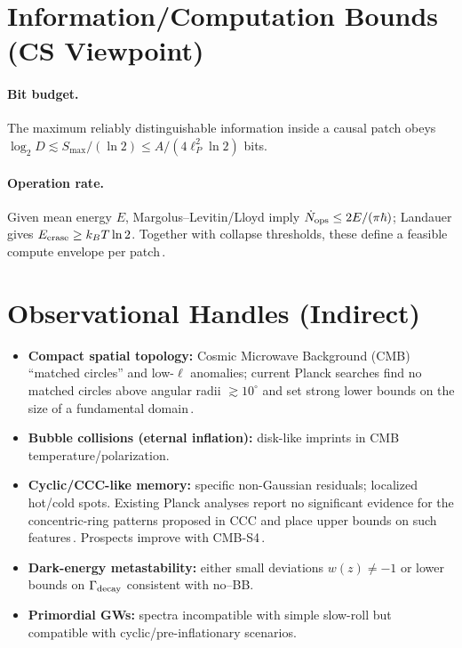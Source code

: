 \documentclass[12pt]{article}
\newcommand{\Smax}{S_{\max}}
\theoremstyle{remark}
\begin{document}
\section{Information/Computation Bounds (CS Viewpoint)}
\paragraph{Bit budget.} The maximum reliably distinguishable information inside a causal patch obeys $\log_2 D \lesssim \Smax/(\ln 2) \le A/(4\ell_P^2\ln 2)$ bits.
\paragraph{Operation rate.} Given mean energy $E$, Margolus--Levitin/Lloyd imply $\dot N_{\rm ops} \le 2E/(\pi\hbar)$; Landauer gives $E_{\rm erase}\ge k_B T \ln 2$. Together with collapse thresholds, these define a feasible compute envelope per patch\,\cite{MargolusLevitin1998,Lloyd2000}.

\section{Observational Handles (Indirect)}
\begin{itemize}[leftmargin=1.2em]
  \item \textbf{Compact spatial topology:} Cosmic Microwave Background (CMB) ``matched circles'' and low-$\ell$ anomalies; current Planck searches find no matched circles above angular radii $\gtrsim 10^{\circ}$ and set strong lower bounds on the size of a fundamental domain\,\cite{CornishSpergelStarkman1998,Planck2016Topology}.
  \item \textbf{Bubble collisions (eternal inflation):} disk-like imprints in CMB temperature/polarization.
  \item \textbf{Cyclic/CCC-like memory:} specific non-Gaussian residuals; localized hot/cold spots. Existing Planck analyses report no significant evidence for the concentric-ring patterns proposed in CCC and place upper bounds on such features\,\cite{WehusEriksen2011,Planck2015Isotropy}. Prospects improve with CMB-S4\,\cite{CMBS4SB}.
  \item \textbf{Dark-energy metastability:} either small deviations $w(z)\neq -1$ or lower bounds on $\Gamma_{\rm decay}$ consistent with no--BB.
  \item \textbf{Primordial GWs:} spectra incompatible with simple slow-roll but compatible with cyclic/pre-inflationary scenarios.
\end{itemize}
\end{document}
